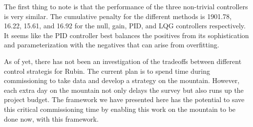 The first thing to note is that the performance of the three non-trivial controllers is very similar. The cumulative penalty for the different methods is 1901.78, 16.22, 15.61, and 16.92 for the null, gain, PID, and LQG controllers respectively. It seems like the PID controller best balances the positives from its sophistication and parameterization with the negatives that can arise from overfitting. 

As of yet, there has not been an investigation of the tradeoffs between different control strategis for Rubin. The current plan is to spend time during commissioning to take data and develop a strategy on the mountain. However, each extra day on the mountain not only delays the survey but also runs up the project budget. The framework we have presented here
has the potential to save this critical commissioning time by enabling this work on the mountain to be done now, with this framework. 
